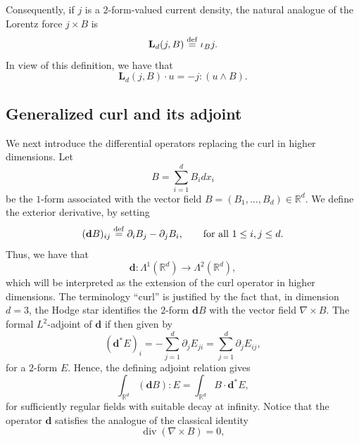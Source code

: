 \documentclass[11pt, leqno, a4paper,]{amsart}
\theoremstyle{remark}
\numberwithin{equation}{section}
\newcommand*{\bydef}{\overset{\rm def}{=}}
\renewcommand*{\div}{\operatorname{div}}
\begin{document}
Consequently, if $j$ is a $2$-form-valued current density, the natural analogue of the Lorentz force $j\times B $ is 
\begin{equation*}
	\mathbf L _d (j,B)\bydef  \iota _B j.
\end{equation*}
In view of this definition, we have that
\begin{equation}\label{eq:lorentz-cancellation}
\mathbf L_d(j,B)\cdot u= -
j:(u\wedge B).
\end{equation}

\subsection{Generalized curl and its adjoint} We next introduce the differential operators replacing the curl in higher dimensions. Let
\begin{equation*}
	B= \sum_{i=1}^d B_i dx_i
\end{equation*}
be the $1$-form associated with the vector field $B=(B_1,\dots, B_d)\in \mathbb R^d$. We define  the exterior derivative, by setting 
\begin{equation}\label{eq:generalized-curl}
(\textbf{d} B)_{ij} \bydef 
\partial_iB_j-\partial_jB_i, \qquad \text{for all } 1\leq i,j\leq d. 
\end{equation}
Thus, we have that 
\begin{equation*}
	\textbf{d} : \Lambda^1 (\mathbb R^d) \to \Lambda^2 (\mathbb R^d),
\end{equation*}
which will be interpreted as the extension of the curl operator in higher dimensions. The terminology ``curl'' is justified by the fact that, in dimension $d=3$, the Hodge star identifies the $2$-form $\mathbf dB$ with the vector field $\nabla \times B$.
The formal $L^2$-adjoint of $ \textbf{d}$ if then given by 
\begin{equation}\label{eq:generalized-curl-adjoint}
(\textbf{d}^*E)_i
=-\sum_{j=1}^d\partial_jE_{ji} =  \sum_{j=1}^d\partial_jE_{ij},
\end{equation}
for a $2$-form $E$. Hence, the defining adjoint relation gives
\begin{equation}\label{eq:curl-adjoint}
\int_{\mathbb R^d}
(\textbf{d}B):E  = 
\int_{\mathbb R^d}
B\cdot\textbf{d}^*E ,
\end{equation}
for sufficiently regular fields with suitable decay at infinity. 
Notice that  the operator $\textbf{d}$ satisfies the analogue of the classical identity
\begin{equation*}
	\div (\nabla \times B)=0,
\end{equation*}
\end{document}

